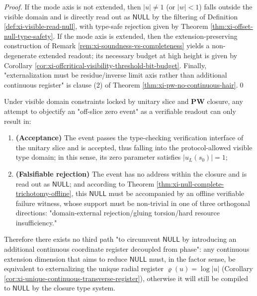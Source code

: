 \begin{proof}
If the mode axis is not extended, then \(|u|\neq 1\) (or \(|w|<1\)) falls outside the visible domain and is directly read out as \(\mathsf{NULL}\) by the filtering of Definition \ref{def:xi-visible-read-null}, with type-safe rejection given by Theorem \ref{thm:xi-offset-null-type-safety}.
If the mode axis is extended, then the extension-preserving construction of Remark \ref{rem:xi-soundness-vs-completeness} yields a non-degenerate extended readout; its necessary budget at high height is given by Corollary \ref{cor:xi-offcritical-visibility-threshold-bit-budget}.
Finally, "externalization must be residue/inverse limit axis rather than additional continuous register" is clause (2) of Theorem \ref{thm:xi-pw-no-continuous-hair}.\qed
\end{proof}

\begin{corollary}\label{cor:xi-offcritical-dichotomy-acceptable-or-null}
Under visible domain constraints locked by unitary slice and \(\mathbf{PW}\) closure, any attempt to objectify an "off-slice zero event" as a verifiable readout can only result in:
\begin{enumerate}
  \item \textbf{(Acceptance)} The event passes the type-checking verification interface of the unitary slice and is accepted, thus falling into the protocol-allowed visible type domain; in this sense, its zero parameter satisfies \(|u_L(s_0)|=1\);
  \item \textbf{(Falsifiable rejection)} The event has no address within the closure and is read out as \(\mathsf{NULL}\); and according to Theorem \ref{thm:xi-null-complete-trichotomy-offline}, this \(\mathsf{NULL}\) must be accompanied by an offline verifiable failure witness, whose support must be non-trivial in one of three orthogonal directions: "domain-external rejection/gluing torsion/hard resource insufficiency."
\end{enumerate}
Therefore there exists no third path "to circumvent \(\mathsf{NULL}\) by introducing an additional continuous coordinate register decoupled from phase": any continuous extension dimension that aims to reduce \(\mathsf{NULL}\) must, in the factor sense, be equivalent to externalizing the unique radial register \(\varrho(u)=\log|u|\) (Corollary \ref{cor:xi-unique-continuous-transverse-register}), otherwise it will still be compiled to \(\mathsf{NULL}\) by the closure type system.
\end{corollary}


